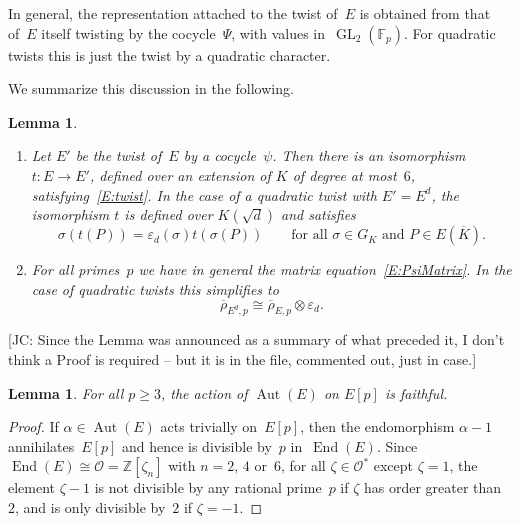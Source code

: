 \documentclass[12pt, reqno]{amsart}
\newcommand{\F}{\mathbb{F}}
\newcommand{\Z}{\mathbb{Z}}
\newcommand{\Kbar}{{\overline{K}}}
\newcommand{\rhobar}{{\overline{\rho}}}
\newcommand{\eps}{\varepsilon}
\newcommand{\calO}{\mathcal{O}}
\DeclareMathOperator{\Aut}{Aut}
\DeclareMathOperator{\End}{End}
\newcommand{\GL}{\operatorname{GL}}
\numberwithin{equation}{section}
\newtheorem{lemma}[theorem]{Lemma}
\theoremstyle{definition}
\theoremstyle{remark}
\newcommand{\jc}[1]{{\color{darkgreen} \textsf{[JC: #1]}}}
\begin{document}
In general, the representation attached to the twist of~$E$ is
obtained from that of~$E$ itself twisting by the cocycle~$\Psi$, with
values in~$\GL_2(\F_p)$.  For quadratic twists this is just the twist
by a quadratic character.

We summarize this discussion in the following.

\begin{lemma}\label{L:twist-rep}
  \begin{enumerate}
\item Let $E'$ be the twist of~$E$ by a cocycle~$\psi$. Then there is
  an isomorphism $t :E\to E'$, defined over an extension of $K$ of
  degree at most~$6$, satisfying~\eqref{E:twist}.
  In the case of a quadratic twist with $E'=E^d$, the isomorphism $t$
  is defined over $K(\sqrt{d})$ and satisfies
\begin{equation}\label{E:iso-twist}
\sigma(t (P)) = \eps_d(\sigma)t (\sigma(P)) \qquad\text{for
  all~$\sigma\in G_K$ and $P\in E(\Kbar)$}.
\end{equation}
\item For all primes~$p$ we have in general the matrix
  equation~\eqref{E:PsiMatrix}.
In the case of quadratic twists this simplifies to
  \begin{equation} \label{E:rho-twist}
  \rhobar_{E^d,p} \cong \rhobar_{E,p}\otimes\eps_d.
\end{equation}
\end{enumerate}
\end{lemma}

\jc{Since the Lemma was announced as a summary of what preceded it, I
  don't think a Proof is required -- but it is in the file, commented
  out, just in case.}
\begin{comment}
\begin{proof}
Equation (\ref{E:iso-twist}) is a special case
of~\eqref{E:twist}. Relation (\ref{E:rho-twist}) follows immediately
from (\ref{E:iso-twist}) and also from the matrix
equation~\eqref{E:PsiMatrix} since
$\Psi_{\sigma}=\varepsilon_d(\sigma)I$.
\end{proof}
\end{comment}

\begin{lemma} \label{L:faithful}
  For all $p\ge3$, the action of $\Aut(E)$ on $E[p]$ is faithful.
\end{lemma}
\begin{proof}
If $\alpha\in\Aut(E)$ acts trivially on~$E[p]$, then the endomorphism
$\alpha-1$ annihilates~$E[p]$ and hence is divisible by~$p$
in~$\End(E)$.  Since $\End(E)\cong\calO=\Z[\zeta_n]$ with $n=2$, $4$
or~$6$, for all $\zeta\in \calO^*$ except $\zeta=1$, the element
$\zeta-1$ is not divisible by any rational prime~$p$ if $\zeta$
has order greater than~$2$, and is only divisible by~$2$ if
$\zeta=-1$.
\end{proof}
\end{document}
